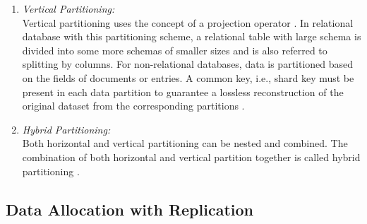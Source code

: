 \begin{enumerate}
\begin{itemize}
\end{itemize}

\noindent Sharding is a way to scale out a database via horizontal partitioning \cite{runceanu2008fragmentation, rahimi2010distributed}. It enables horizontal scalability (scale-out) is supported by distributing distinct portions of the data across various database servers, a process referred to as sharding. The objective is to direct different requests to individual database nodes, thereby achieving load balancing among the nodes. Concepts and approaches of sharding in distributed databases is further explored in the section \ref{shardingDD}.

\item	\emph{Vertical Partitioning:} \\
Vertical partitioning uses the concept of a projection operator \cite{ozsu1999principles}. In relational database with this partitioning scheme, a relational table with large schema is divided into some more schemas of smaller sizes and is also referred to splitting by columns. For non-relational databases, data is partitioned based on the fields of documents or entries. A common key, i.e., shard key must be present in each data partition to guarantee a lossless reconstruction of the original dataset from the corresponding partitions \cite{navathe1984vertical}.

\item \emph{Hybrid Partitioning:} \\
Both horizontal and vertical partitioning can be nested and combined. The combination of both horizontal and vertical partition together is called hybrid partitioning \cite{6680961}.

\end{enumerate}

\subsection{Data Allocation with Replication}

